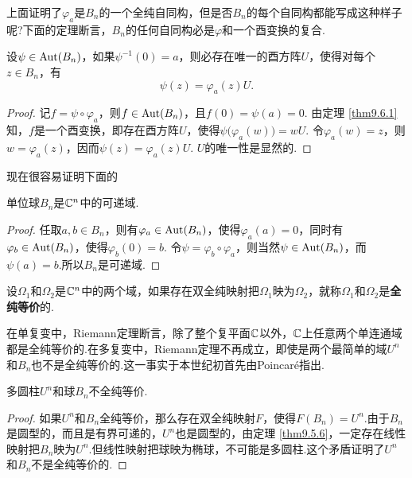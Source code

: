 上面证明了$\varphi_a$是$B_n$的一个全纯自同构，但是否$B_n$的每个自同构都能写成这种样子呢?下面的定理断言，$B_n$的任何自同构必是$\varphi$和一个酉变换的复合.
\begin{theorem}\label{thm9.6.3}
  设$\psi\in\operatorname{Aut}(B_n)$，如果$\psi^{-1}(0)=a$，则必存在唯一的酉方阵$U$，使得对每个$z\in B_n$，有
  \[
    \psi(z) = \varphi_a(z)U.
  \]
\end{theorem}
\begin{proof}
  记$f=\psi\circ \varphi_a$，则$f\in\operatorname{Aut}(B_n)$，且$f(0)=\psi(a)=0$. 由定理 \ref{thm9.6.1} 知，$f$是一个酉变换，即存在酉方阵$U$，使得$\psi\big(\varphi_a(w)\big)=wU$. 令$\varphi_a(w)=z$，则$w=\varphi_a(z)$，因而$\psi(z)=\varphi_a(z)U$. $U$的唯一性是显然的.
\end{proof}

现在很容易证明下面的
\begin{theorem}\label{thm9.6.4}
  单位球$B_n$是$\mathbb C^n$中的可递域.
\end{theorem}
\begin{proof}
  任取$a,b\in B_n$，则有$\varphi_a\in\operatorname{Aut}(B_n)$，使得$\varphi_a(a)=0$，同时有$\varphi_b\in\operatorname{Aut}(B_n)$，使得$\varphi_b(0)=b$. 令$\psi=\varphi_b\circ\varphi_a$，则当然$\psi\in\operatorname{Aut}(B_n)$，而$\psi(a)=b$.所以$B_n$是可递域.
\end{proof}

\begin{definition}\label{def9.6.5}
  设$\Omega_1$和$\Omega_2$是$\mathbb C^n$中的两个域，如果存在双全纯映射把$\Omega_1$映为$\Omega_2$，就称$\Omega_1$和$\Omega_2$是\textbf{全纯等价}的.
\end{definition}

在单复变中，Riemann定理断言，除了整个复平面$\mathbb C$以外，$\mathbb C$上任意两个单连通域都是全纯等价的.在多复变中，Riemann定理不再成立，即使是两个最简单的域$U^n$和$B_n$也不是全纯等价的.这一事实于本世纪初首先由Poincar\'e指出.
\begin{theorem}
  多圆柱$U^n$和球$B_n$不全纯等价.
\end{theorem}
\begin{proof}
  如果$U^n$和$B_n$全纯等价，那么存在双全纯映射$F$，使得$F(B_n)=U^n$.由于$B_n$是圆型的，而且是有界可递的，$U^n$也是圆型的，由定理 \ref{thm9.5.6}，一定存在线性映射把$B_n$映为$U^n$.但线性映射把球映为椭球，不可能是多圆柱.这个矛盾证明了$U^n$和$B_n$不是全纯等价的.
\end{proof}

